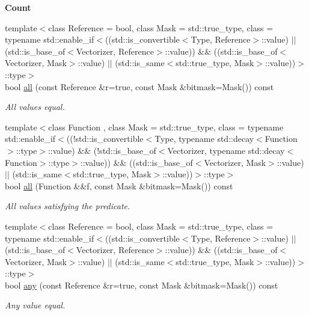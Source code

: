 \begin{Indent}{\bf Count}
\begin{DoxyCompactItemize}
{\footnotesize template$<$class Reference  = bool, class Mask  = std\-::true\-\_\-type, class  = typename std\-::enable\-\_\-if$<$((std\-::is\-\_\-convertible$<$\-Type, Reference$>$\-::value) $|$$|$ (std\-::is\-\_\-base\-\_\-of$<$\-Vectorizer, Reference$>$\-::value)) \&\& ((std\-::is\-\_\-base\-\_\-of$<$\-Vectorizer, Mask$>$\-::value) $|$$|$ (std\-::is\-\_\-same$<$std\-::true\-\_\-type, Mask$>$\-::value))$>$\-::type$>$ }\\bool \hyperlink{classmagrathea_1_1StaticVectorizer_a73db982b65b3486bf0a8d8f9819074bb}{all} (const Reference \&r=true, const Mask \&bitmask=Mask()) const 
\begin{DoxyCompactList}\small\item\em All values equal. \end{DoxyCompactList}\item 
{\footnotesize template$<$class Function , class Mask  = std\-::true\-\_\-type, class  = typename std\-::enable\-\_\-if$<$((!std\-::is\-\_\-convertible$<$\-Type, typename std\-::decay$<$\-Function$>$\-::type$>$\-::value) \&\& (!std\-::is\-\_\-base\-\_\-of$<$\-Vectorizer, typename std\-::decay$<$\-Function$>$\-::type$>$\-::value)) \&\& ((std\-::is\-\_\-base\-\_\-of$<$\-Vectorizer, Mask$>$\-::value) $|$$|$ (std\-::is\-\_\-same$<$std\-::true\-\_\-type, Mask$>$\-::value))$>$\-::type$>$ }\\bool \hyperlink{classmagrathea_1_1StaticVectorizer_a4f53cb6cecd0fa137baec7d459a54446}{all} (Function \&\&f, const Mask \&bitmask=Mask()) const 
\begin{DoxyCompactList}\small\item\em All values satisfying the predicate. \end{DoxyCompactList}\item 
{\footnotesize template$<$class Reference  = bool, class Mask  = std\-::true\-\_\-type, class  = typename std\-::enable\-\_\-if$<$((std\-::is\-\_\-convertible$<$\-Type, Reference$>$\-::value) $|$$|$ (std\-::is\-\_\-base\-\_\-of$<$\-Vectorizer, Reference$>$\-::value)) \&\& ((std\-::is\-\_\-base\-\_\-of$<$\-Vectorizer, Mask$>$\-::value) $|$$|$ (std\-::is\-\_\-same$<$std\-::true\-\_\-type, Mask$>$\-::value))$>$\-::type$>$ }\\bool \hyperlink{classmagrathea_1_1StaticVectorizer_a7948842eae5d264383ec3b3a125f66fd}{any} (const Reference \&r=true, const Mask \&bitmask=Mask()) const 
\begin{DoxyCompactList}\small\item\em Any value equal. \end{DoxyCompactList}\item 

\end{DoxyCompactItemize}
\end{Indent}
